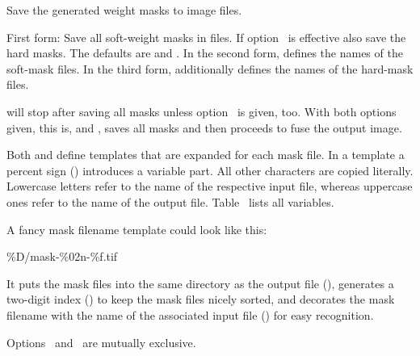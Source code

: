 \begin{codelist}
\ifenfuse
  \label{opt:save-masks}%
  \item[\itempar{--save-masks~\textrm{(\oldstylefirst~form)}
      \\ --save-masks=\metavar{SOFT-MASK-TEMPLATE}~\textrm{(\oldstylesecond~form)}
      \\ --save-masks=\metavar{SOFT-MASK-TEMPLATE}:\feasiblebreak
      \metavar{HARD-MASK-TEMPLATE}~\textrm{(\oldstylethird~form)}}]\itemend
    Save the generated weight
    masks to image files.

    \begin{sloppypar}
      First form: Save all soft-weight masks in files.  If
      option~ is effective also save the hard
      masks.  The defaults are
       and
      . In the second form,
       defines the names of the
      soft-mask files.  In the third form,
       additionally defines the
      names of the hard-mask files.
    \end{sloppypar}

    \App{} will stop after saving all masks unless
    option~ is given, too.  With both options given,
    this is,  and , \App{} saves
    all masks and then proceeds to fuse the output image.

    Both  and
     define templates that are
    expanded for each mask file.  In a template a percent sign
    (\sample{\%}) introduces a variable part.  All other characters
    are copied literally.  Lowercase letters refer to the name of the
    respective input file, whereas uppercase ones refer to the name of
    the output file.  Table~
    lists all variables.

    A fancy mask filename template could look like this:
    \begin{literal}
      \%D/mask-\%02n-\%f.tif
    \end{literal}
    It puts the mask files into the same directory as the output file
    (), generates a two-digit index () to
    keep the mask files nicely sorted, and decorates the mask filename
    with the name of the associated input file () for easy
    recognition.

    Options~ and~ are
    mutually exclusive.
\fi
\end{codelist}


\ifenfuse
  
\fi

